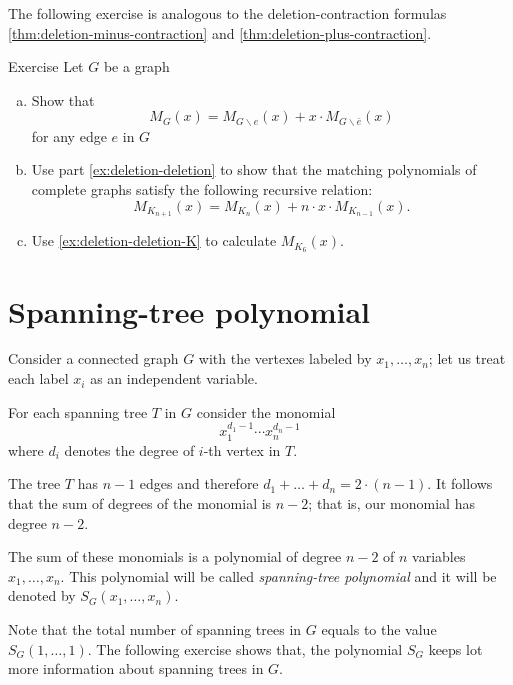 The following exercise is analogous to the deletion-contraction formulas \ref{thm:deletion-minus-contraction} and \ref{thm:deletion-plus-contraction}.

\begin{thm}{Exercise}\label{ex:deletion-deletion-total}
Let $G$ be a graph
\begin{enumerate}[(a)]
\item\label{ex:deletion-deletion} Show that
\[M_G(x)=M_{G\backslash e}(x)+x\cdot M_{G\backslash \bar e}(x)\]
for any edge $e$ in $G$

\item\label{ex:deletion-deletion-K} Use part \ref{ex:deletion-deletion} to show that the matching polynomials of complete graphs satisfy the following recursive relation:
\[M_{K_{n+1}}(x)=M_{K_{n}}(x)+n\cdot x\cdot M_{K_{n-1}}(x).\]

\item Use \ref{ex:deletion-deletion-K} to calculate $M_{K_6}(x)$. 
\end{enumerate}

\end{thm}

\section*{Spanning-tree polynomial}

Consider a connected graph $G$ with the vertexes labeled by $x_1,\dots,x_n$;
let us treat each label $x_i$ as an independent variable.

For each spanning tree $T$ in $G$ consider the monomial 
\[x_1^{d_1-1}\cdots x_n^{d_n-1}\]
where $d_i$ denotes the degree of $i$-th vertex in $T$.

The tree $T$ has $n-1$ edges and therefore 
$d_1+\dots+d_n=2\cdot(n-1)$.
It follows that the sum of degrees of the monomial is $n-2$;
that is, our monomial has degree $n-2$.

The sum of these monomials is a polynomial of degree $n-2$ of $n$ variables $x_1,\dots, x_n$.
This polynomial will be called \emph{spanning-tree polynomial} and it will be denoted by 
$S_G(x_1,\dots,x_n)$.

Note that the total number of spanning trees in $G$ equals to the value
$S_G(1,\dots,1)$.
The following exercise shows that,
the polynomial $S_G$ keeps lot more information about spanning trees in $G$.

